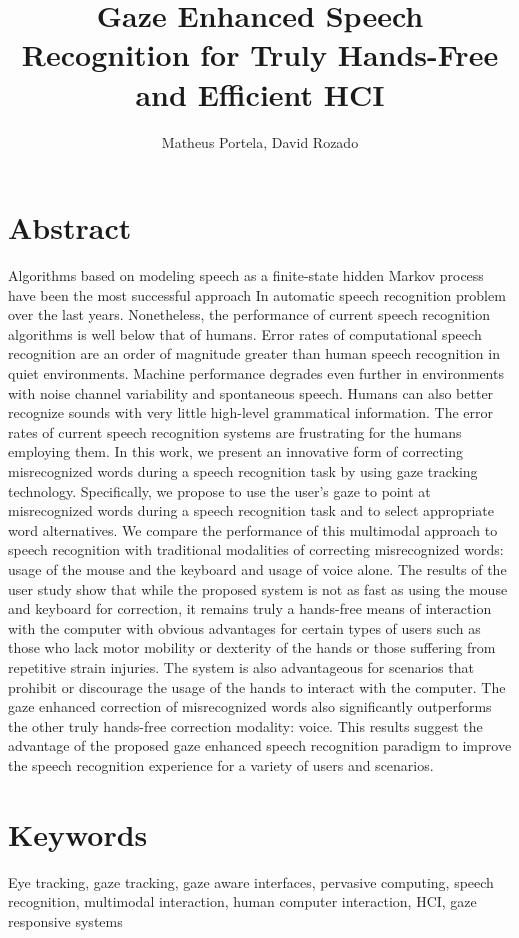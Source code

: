 \documentclass[]{article}
\title{Gaze Enhanced Speech Recognition for Truly Hands-Free and Efficient HCI}
\author{Matheus Portela, David Rozado}
\begin{document}
\maketitle

\section{Abstract}
Algorithms based on modeling speech as a finite-state hidden Markov process have been the most successful approach In
automatic speech recognition problem over the last years. Nonetheless, the performance of current speech recognition
algorithms is well below that of humans. Error rates of computational speech recognition are an order of magnitude
greater than human speech recognition in quiet environments. Machine performance degrades even further in environments
with noise channel variability and spontaneous speech. Humans can also better recognize sounds with very little
high-level grammatical information. The error rates of current speech recognition systems are frustrating for the humans
employing them. In this work, we present an innovative form of correcting misrecognized words during a speech
recognition task by using gaze tracking technology. Specifically, we propose to use the user's gaze to point at
misrecognized words during a speech recognition task and to select appropriate word alternatives. We compare  the
performance of this multimodal approach to speech recognition with traditional modalities of correcting misrecognized
words: usage of the mouse and the keyboard and usage of voice alone. The results of the user study show that while the
proposed system is not as fast as using the mouse and keyboard for correction, it remains truly a hands-free means of interaction with
the computer with obvious advantages for certain types of users such as those who lack  motor mobility or dexterity of
the hands or those suffering from repetitive strain injuries. The system is also advantageous for scenarios that
prohibit or discourage the usage of the hands to interact with the computer. The gaze enhanced correction of
misrecognized words also significantly outperforms the other truly hands-free correction modality: voice. This results
suggest the advantage of the proposed gaze enhanced speech recognition paradigm to improve the speech recognition
experience for a variety of users and scenarios.

\section{Keywords}
Eye tracking, gaze tracking, gaze aware interfaces, pervasive computing, speech recognition, multimodal interaction,
human computer interaction, HCI, gaze responsive systems 
\end{document}
